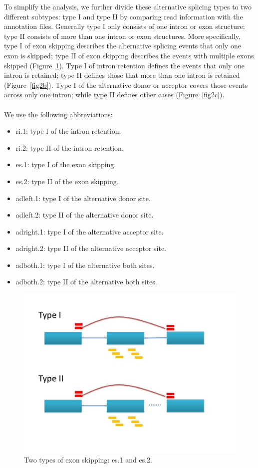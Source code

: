 \documentclass[a4paper]{article}
\begin{document}
To simplify the analysis, we further divide these 
alternative splicing types to two different subtypes: 
type I and type II by comparing read information with 
the annotation files. Generally type I only consists of one intron or exon 
structure; type II consists of more than one intron or exon structures. 
More specifically, type I of exon skipping describes the alternative splicing 
events that only one exon is skipped; type II of exon skipping describes the 
events with multiple exons skipped  (Figure~\ref{fig2a}). Type I of intron retention defines the 
events that only one intron is retained; type II defines those that more than 
one intron is retained  (Figure~\ref{fig2b}). Type I of the alternative donor or acceptor covers 
those events across only one intron; while type II defines other cases  (Figure~\ref{fig2c}).
\\ \\
We use the following abbreviations: 
\begin{itemize}
	\item ri.1: type I of the intron retention.
	\item ri.2: type II of the intron retention.
	\item es.1: type I of the exon skipping.
	\item es.2: type II of the exon skipping.
	\item adleft.1: type I of the alternative donor site.
	\item adleft.2: type II of the alternative donor site.
	\item adright.1: type I of the alternative acceptor site.
	\item adright.2: type II of the alternative acceptor site.
	\item adboth.1: type I of the alternative both sites.
\item adboth.2: type II of the alternative both sites.
\end{itemize} 

\begin{figure}[ht]
\centering
\includegraphics[scale=0.5]{fig1.jpg}
\caption{Two types of exon skipping: es.1 and es.2.}
\label{fig2a}
\end{figure}
\end{document}
